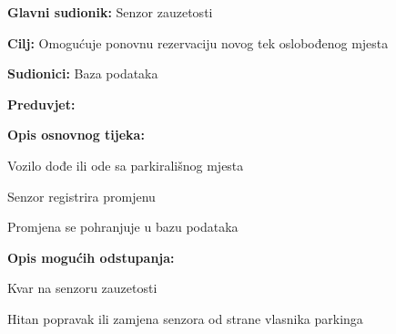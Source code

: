     				\noindent {}
    				\begin{packed_item}
    					
    					\item \textbf{Glavni sudionik:} Senzor zauzetosti
    					\item  \textbf{Cilj:} Omogućuje ponovnu rezervaciju novog tek oslobođenog mjesta
    					\item  \textbf{Sudionici:} Baza podataka
    					\item  \textbf{Preduvjet:} 
    					\item  \textbf{Opis osnovnog tijeka:}
    					
    					\item[] \begin{packed_enum}
    						
    						\item Vozilo dođe ili ode sa parkirališnog mjesta
    						\item Senzor registrira promjenu
    						\item Promjena se pohranjuje u bazu podataka
    					\end{packed_enum}
    					
    					\item  \textbf{Opis mogućih odstupanja:}
    					
    					\item[] \begin{packed_item}
    						
    						\item[2.a] Kvar na senzoru zauzetosti
    						\item[] \begin{packed_enum}
    							
    							\item Hitan popravak ili zamjena senzora od strane vlasnika parkinga
    							
    						\end{packed_enum}
    						
    					\end{packed_item}
    				\end{packed_item}
    			
